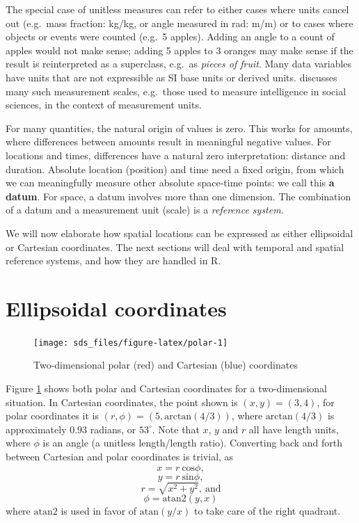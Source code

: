 \documentclass[]{book}
\begin{document}
The special case of unitless measures can refer to either cases
where units cancel out (e.g.~mass fraction: kg/kg, or angle measured
in rad: m/m) or to cases where objects or events were counted
(e.g.~5 apples). Adding an angle to a count of apples would not
make sense; adding 5 apples to 3 oranges may make sense if the
result is reinterpreted as a superclass, e.g.~as \emph{pieces of fruit}.
Many data variables have units that are not expressible as SI base
units or derived units. \citet{hand} discusses many such measurement scales,
e.g.~those used to measure intelligence in social sciences, in the
context of measurement units.

For many quantities, the natural origin of values is zero. This
works for amounts, where differences between amounts result in
meaningful negative values. For locations and times, differences
have a natural zero interpretation: distance and duration. Absolute
location (position) and time need a fixed origin, from which we
can meaningfully measure other absolute space-time points: we
call this \textbf{a datum}.
For space, a datum involves more than one dimension. The combination
of a datum and a measurement unit (scale) is a \emph{reference system}.

We will now elaborate how spatial locations can be expressed as
either ellipsoidal or Cartesian coordinates. The next sections will
deal with temporal and spatial reference systems, and how they are
handled in R.

\hypertarget{ellipsoidal-coordinates}{%
\section{Ellipsoidal coordinates}\label{ellipsoidal-coordinates}}

\begin{figure}

{\centering \texttt{[image: sds\_files/figure-latex/polar-1]} 

}

\caption{Two-dimensional polar (red) and Cartesian (blue) coordinates}\label{fig:polar}
\end{figure}

Figure \ref{fig:polar} shows both polar and Cartesian coordinates
for a two-dimensional situation. In Cartesian coordinates,
the point shown is \((x,y) = (3,4)\), for polar coordinates it is
\((r,\phi) = (5, \mbox{arctan}(4/3))\), where \(\mbox{arctan}(4/3)\) is
approximately \(0.93\) radians, or \(53^{\circ}\). Note that \(x\), \(y\)
and \(r\) all have length units, where \(\phi\) is an angle (a unitless
length/length ratio). Converting back and forth between Cartesian
and polar coordinates is trivial, as
\[x = r~\mbox{cos} \phi,\]
\[y = r~\mbox{sin} \phi,\]
\[r = \sqrt{x^2 + y^2}, \ \mbox{and}\]
\[\phi = \mbox{atan2}(y, x)\]
where \(\mbox{atan2}\) is used in favor of \(\mbox{atan}(y/x)\) to take care
of the right quadrant.
\end{document}
